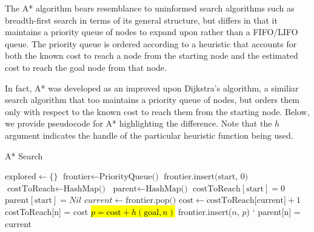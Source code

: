 \documentclass[12pt, conference, compsocconf]{IEEEtran}
\begin{document}
The A* algorithm bears resemblance to uninformed search algorithms such as breadth-first search in terms of its general structure, but differs in that it maintains a priority queue of nodes to expand upon rather than a FIFO/LIFO queue. 
The priority queue is ordered according to a heuristic that accounts for both the known cost to reach a node from the starting node and the estimated cost to reach the goal node from that node. 

In fact, A* was developed as an improved upon Dijkstra's algorithm, a similiar search algorithm that too maintains a priority queue of nodes, but orders them only with respect to the known cost to reach them from the starting node. 
Below, we provide pseudocode for A* highlighting the difference.
Note that the $h$ argument indicates the handle of the particular heuristic function being used. 

\begin{algorithm}
    \caption{A* Search}
    \label{alg-astar}
    \begin{algorithmic}[1]
            \State $\text{explored} \gets \{\}$
            \State $\text{frontier} \gets \text{PriorityQueue()}$
            \State $\text{frontier.insert(start, 0)}$
            \State $\text{costToReach} \gets \text{HashMap()}$
            \State $\text{parent} \gets \text{HashMap()}$
            \State $\text{costToReach}[\text{start}] = 0$
            \State $\text{parent}[\text{start}] = Nil$
                \State $current \gets \text{frontier.pop()}$
                \Else
                        \State $\text{cost} \gets \text{costToReach[current]} + 1$
                                \State costToReach[n] = cost
                                \State \hl{$p = \text{cost} + h(\text{goal}, n)$}
                                \State frontier.insert($n$, $p$)
            `                   \State parent[n] = current
                            \EndIf
                        \EndFor
                \EndIf
            \EndWhile
        \State {}
        \EndFunction
    \end{algorithmic}
\end{algorithm}
\end{document}

